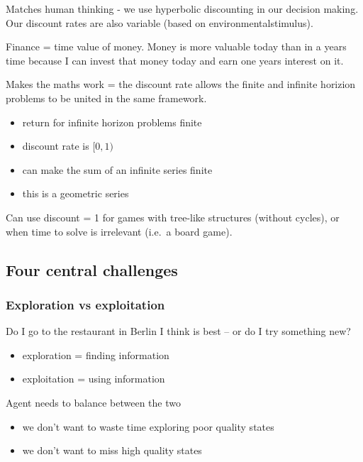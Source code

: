 \documentclass[]{article}
\providecommand{\tightlist}{%
  \setlength{\itemsep}{0pt}\setlength{\parskip}{0pt}}
\begin{document}
Matches human thinking - we use hyperbolic discounting in our decision
making. Our discount rates are also variable (based on
environmentalstimulus).

Finance = time value of money. Money is more valuable today than in a
years time because I can invest that money today and earn one years
interest on it.

Makes the maths work = the discount rate allows the finite and infinite
horizion problems to be united in the same framework.

\begin{itemize}
\tightlist
\item
  return for infinite horizon problems finite
\item
  discount rate is \([0,1)\)
\item
  can make the sum of an infinite series finite
\item
  this is a geometric series
\end{itemize}

Can use discount = 1 for games with tree-like structures (without
cycles), or when time to solve is irrelevant (i.e.~a board game).

\newpage

\hypertarget{four-central-challenges}{%
\subsection{Four central challenges}\label{four-central-challenges}}

\hypertarget{exploration-vs-exploitation}{%
\subsubsection{Exploration vs
exploitation}\label{exploration-vs-exploitation}}

Do I go to the restaurant in Berlin I think is best -- or do I try
something new?

\begin{itemize}
\tightlist
\item
  exploration = finding information
\item
  exploitation = using information
\end{itemize}

Agent needs to balance between the two

\begin{itemize}
\tightlist
\item
  we don't want to waste time exploring poor quality states
\item
  we don't want to miss high quality states
\end{itemize}
\end{document}
